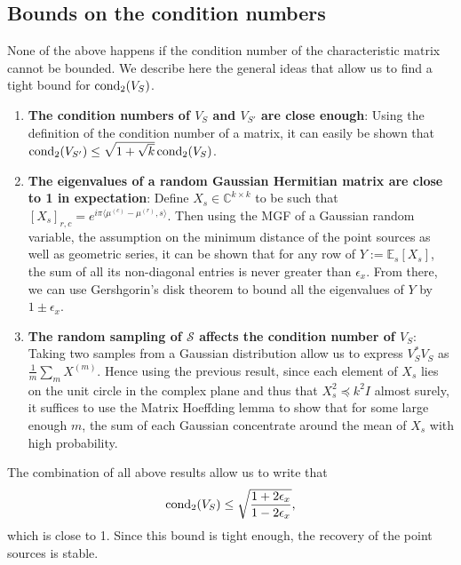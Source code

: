 \subsection{Bounds on the condition numbers}
None of the above happens if the condition number of the characteristic matrix cannot be bounded. We describe here the general ideas that allow us to find a tight bound for $\operatorname*{cond_2}(V_S)$.
\begin{enumerate}
    \item {\bf The condition numbers of $V_S$ and $V_{S'}$ are close enough}: Using the definition of the condition number of a matrix, it can easily be shown that $\operatorname*{cond_2}(V_{S'})\leq\sqrt{1+\sqrt{k}}\operatorname*{cond_2}(V_S)$.
    \item {\bf The eigenvalues of a random Gaussian Hermitian matrix are close to 1 in expectation}: Define $X_s\in\mathbb{C}^{k\times k}$ to be such that $[X_s]_{r,c}=e^{i\pi\langle\mu^{(c)}-\mu^{(r)},s\rangle}$. Then using the MGF of a Gaussian random variable, the assumption on the minimum distance of the point sources as well as geometric series, it can be shown that for any row of $Y:=\mathbb{E}_s[X_s]$, the sum of all its non-diagonal entries is never greater than $\epsilon_x$. From there, we can use Gershgorin's disk theorem to bound all the eigenvalues of $Y$ by $1\pm\epsilon_x$.
    \item {\bf The random sampling of $\mathcal{S}$ affects the condition number of $V_S$}: Taking two samples from a Gaussian distribution allow us to express $V_S^*V_S$ as $\frac{1}{m}\sum_m X^{(m)}$. Hence using the previous result, since each element of $X_s$ lies on the unit circle in the complex plane and thus that $X_s^2\preceq k^2 I$ almost surely, it suffices to use the Matrix Hoeffding lemma to show that for some large enough $m$, the sum of each Gaussian concentrate around the mean of $X_s$ with high probability.
\end{enumerate}
The combination of all above results allow us to write that $$\operatorname*{cond_2}(V_S)\leq\sqrt{\frac{1+2\epsilon_x}{1-2\epsilon_x}},$$ which is close to 1. Since this bound is tight enough, the recovery of the point sources is stable.